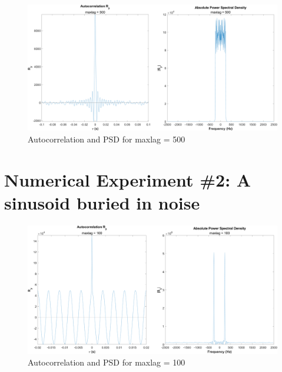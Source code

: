 \documentclass[12pt]{article}
\begin{document}
\begin{figure}[h]
	\centering
	\includegraphics[width=\textwidth]{exp1_maxlag_500}
	\caption{\label{fig:exp1_maxlag500}Autocorrelation and PSD for maxlag = 500}
\end{figure}


\section*{Numerical Experiment \#2: A sinusoid buried in noise}




\begin{figure}[h]
	\centering
	\includegraphics[width=\textwidth]{exp2_maxlag_100}
	\caption{\label{fig:exp2_maxlag100}Autocorrelation and PSD for maxlag = 100}
\end{figure}
\end{document}
